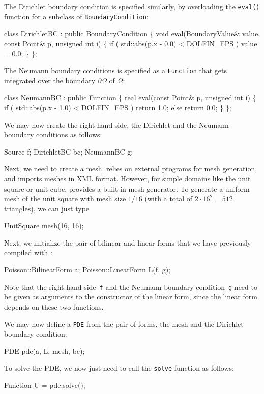 The Dirichlet boundary condition is specified similarly, by overloading the
\texttt{eval()} function for a subclass of \texttt{BoundaryCondition}:
\small
\begin{code}
  class DirichletBC : public BoundaryCondition
  \{
    void eval(BoundaryValue& value, const Point& p, unsigned int i)
    \{
      if ( std::abs(p.x - 0.0) < DOLFIN_EPS )
	value = 0.0;
    \}
  \};
\end{code}
\normalsize
The Neumann boundary conditions is specified as a \texttt{Function}
that gets integrated over the boundary $\partial \Omega$ of $\Omega$:
\begin{code}
  class NeumannBC : public Function
  \{
    real eval(const Point& p, unsigned int i)
    \{
      if ( std::abs(p.x - 1.0) < DOLFIN_EPS )
        return 1.0;
      else
        return 0.0;
    \}
  \};
\end{code}
We may now create the right-hand side, the Dirichlet and the Neumann
boundary conditions as follows:
\begin{code}
  Source f;
  DirichletBC bc;
  NeumannBC g;
\end{code}

Next, we need to create a mesh. \dolfin{} relies on
external programs for mesh generation, and imports meshes in \dolfin{}
XML format. However, for simple domains like the unit square or unit
cube, \dolfin{} provides a built-in mesh generator. To generate a
uniform mesh of the unit square with mesh size $1/16$ (with a total of
$2\cdot 16^2 = 512$ triangles), we can just type
\begin{code}
  UnitSquare mesh(16, 16);
\end{code}

Next, we initialize the pair of bilinear and linear forms that we have
previously compiled with \ffc{}:
\begin{code}
  Poisson::BilinearForm a;
  Poisson::LinearForm L(f, g);
\end{code}
Note that the right-hand side~\texttt{f} and the Neumann boundary
condition~\texttt{g} need to be given as arguments to the constructor
of the linear form, since the linear form depends on these two functions.

We may now define a \texttt{PDE} from the pair of forms, the mesh and
the Dirichlet boundary condition:
\begin{code}
  PDE pde(a, L, mesh, bc);
\end{code}
To solve the PDE, we now just need to call the \texttt{solve} function
as follows:
\begin{code}
  Function U = pde.solve();
\end{code}

